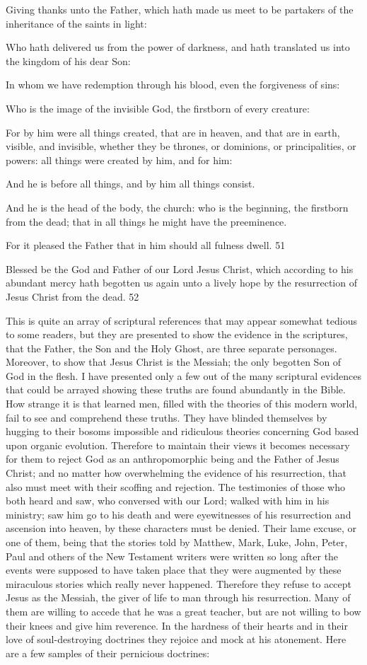 Giving thanks unto the Father, which hath made us meet to be partakers of the inheritance of
the saints in light:

Who hath delivered us from the power of darkness, and hath translated us into the kingdom
of his dear Son:

In whom we have redemption through his blood, even the forgiveness of sins:

Who is the image of the invisible God, the firstborn of every creature:

For by him were all things created, that are in heaven, and that are in earth, visible, and
invisible, whether they be thrones, or dominions, or principalities, or powers: all things were
created by him, and for him:

And he is before all things, and by him all things consist.

And he is the head of the body, the church: who is the beginning, the firstborn from the dead;
that in all things he might have the preeminence.

For it pleased the Father that in him should all fulness dwell. 51

Blessed be the God and Father of our Lord Jesus Christ, which according to his abundant
mercy hath begotten us again unto a lively hope by the resurrection of Jesus Christ from the
dead. 52

This is quite an array of scriptural references that may appear somewhat tedious to some
readers, but they are presented to show the evidence in the scriptures, that the Father, the Son
and the Holy Ghost, are three separate personages. Moreover, to show that Jesus Christ is the
Messiah; the only begotten Son of God in the flesh. I have presented only a few out of the
many scriptural evidences that could be arrayed showing these truths are found abundantly in
the Bible. How strange it is that learned men, filled with the theories of this modern world,
fail to see and comprehend these truths. They have blinded themselves by hugging to their
bosoms impossible and ridiculous theories concerning God based upon organic evolution.
Therefore to maintain their views it becomes necessary for them to reject God as an
anthropomorphic being and the Father of Jesus Christ; and no matter how overwhelming the
evidence of his resurrection, that also must meet with their scoffing and rejection. The
testimonies of those who both heard and saw, who conversed with our Lord; walked with
him in his ministry; saw him go to his death and were eyewitnesses of his resurrection and
ascension into heaven, by these characters must be denied. Their lame excuse, or one of
them, being that the stories told by Matthew, Mark, Luke, John, Peter, Paul and others of the
New Testament writers were written so long after the events were supposed to have taken
place that they were augmented by these miraculous stories which really never happened.
Therefore they refuse to accept Jesus as the Messiah, the giver of life to man through his
resurrection. Many of them are willing to accede that he was a great teacher, but are not
willing to bow their knees and give him reverence. In the hardness of their hearts and in their
love of soul-destroying doctrines they rejoice and mock at his atonement. Here are a few
samples of their pernicious doctrines:

